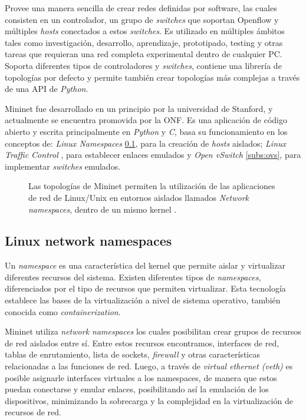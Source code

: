 Provee una manera sencilla de crear redes definidas por software, las cuales consisten en un controlador, un grupo de \textit{switches} que soportan Openflow y múltiples \textit{hosts} conectados a estos \textit{switches}. Es utilizado en múltiples ámbitos tales como investigación, desarrollo, aprendizaje, prototipado, testing y otras tareas que requieran una red completa experimental dentro de cualquier PC. Soporta diferentes tipos de controladores y \textit{switches}, contiene una librería de topologías por defecto y permite también crear topologías más complejas a través de una API de \textit{Python}.

Mininet fue desarrollado en un principio por la universidad de Stanford, y actualmente se encuentra promovida por la ONF. Es una aplicación de código abierto y escrita principalmente en \textit{Python} y \textit{C}, basa su funcionamiento en los conceptos de: \textit{Linux Namespaces} \ref{subs:ns}, para la creación de \textit{hosts} aislados; \textit{Linux Traffic Control} \parencite{ltc}, para establecer enlaces emulados y \textit{Open vSwitch} \ref{subs:ovs}, para implementar \textit{switches} emulados.


\begin{figure}[th]
	\centering 
	\caption[Diagrama de Mininet]{Las topologías de Mininet permiten la utilización de las aplicaciones de red de Linux/Unix en entornos aislados llamados \textit{Network namespaces}, dentro de un mismo kernel \parencite{mininetonf}.}
	\label{fig:mininet}
\end{figure}


\subsection{Linux network namespaces}
\label{subs:ns}
Un \textit{namespace} es una característica del kernel que permite aislar y virtualizar diferentes recursos del sistema. Existen diferentes tipos de \textit{namespaces}, diferenciados por el tipo de recursos que permiten virtualizar. Esta tecnología establece las bases de la virtualización a nivel de sistema operativo, también conocida como \textit{containerization}. 

Mininet utiliza \textit{network namespaces} los cuales posibilitan crear grupos de recursos de red aislados entre sí. Entre estos recursos encontramos, interfaces de red, tablas de enrutamiento, lista de sockets, \textit{firewall} y otras características relacionadas a las funciones de red. Luego, a través de \textit{virtual ethernet (veth)} es posible asignarle interfaces virtuales a los namespaces, de manera que estos puedan conectarse y emular enlaces, posibilitando así la emulación de los dispositivos, minimizando la sobrecarga y la complejidad en la virtualización de recursos de red.


